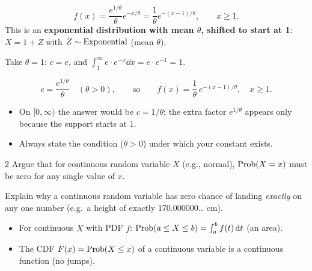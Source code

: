 \documentclass[11pt]{article}
\begin{document}
\[
f(x)=\frac{e^{1/\theta}}{\theta}e^{-x/\theta}=\frac1\theta e^{-(x-1)/\theta},\qquad x\ge1.
\]
This is an \textbf{exponential distribution with mean $\theta$, shifted to start at 1}: $X=1+Z$ with $Z\sim\mathrm{Exponential}$ (mean $\theta$).

\begin{sanity}
Take $\theta=1$: $c=e$, and $\int_1^\infty e\cdot e^{-x}\dd x=e\cdot e^{-1}=1$. \checkmark
\end{sanity}

\begin{answer}
\[
c=\frac{e^{1/\theta}}{\theta}\quad(\theta>0),\qquad\text{so}\qquad f(x)=\frac1\theta\,e^{-(x-1)/\theta},\quad x\ge1.
\]
\end{answer}

\begin{takeaway}
\begin{itemize}
\item On $[0,\infty)$ the answer would be $c=1/\theta$; the extra factor $e^{1/\theta}$ appears only because the support starts at 1.
\item Always state the condition ($\theta>0$) under which your constant exists.
\end{itemize}
\end{takeaway}


\begin{problem}{2}
Argue that for continuous random variable $X$ (e.g., normal), $\mathrm{Prob}(X=x)$ must be zero for any single value of $x$.
\end{problem}

\begin{restate}
Explain why a continuous random variable has zero chance of landing \emph{exactly} on any one number (e.g.\ a height of exactly 170.000000\ldots{} cm).
\end{restate}

\begin{recall}
\begin{itemize}
\item For continuous $X$ with PDF $f$: $\mathrm{Prob}(a\le X\le b)=\int_a^bf(t)\,\mathrm{d} t$ (an area).
\item The CDF $F(x)=\mathrm{Prob}(X\le x)$ of a continuous variable is a continuous function (no jumps).
\end{itemize}
\end{recall}
\end{document}
